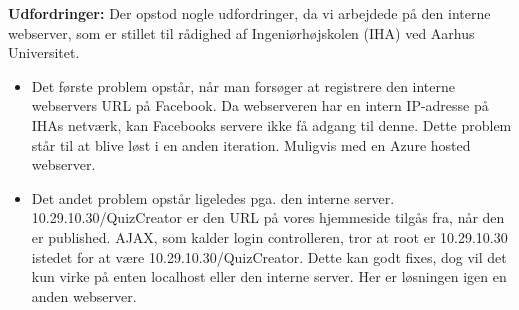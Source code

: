 \textbf{Udfordringer:} 
Der opstod nogle udfordringer, da vi arbejdede på den interne webserver, som er stillet til rådighed af Ingeniørhøjskolen (IHA) ved Aarhus Universitet. 

\begin{itemize}
	\item Det første problem opstår, når man forsøger at registrere den interne webservers URL på Facebook. Da webserveren har en intern IP-adresse på IHAs netværk, kan Facebooks servere ikke få adgang til denne. Dette problem står til at blive løst i en anden iteration. Muligvis med en Azure hosted webserver.
	\item Det andet problem opstår ligeledes pga. den interne server. 10.29.10.30/QuizCreator er den URL på vores hjemmeside tilgås fra, når den er published. AJAX, som kalder login controlleren, tror at root er 10.29.10.30 istedet for at være 10.29.10.30/QuizCreator. Dette kan godt fixes, dog vil det kun virke på enten localhost eller den interne server. Her er løsningen igen en anden webserver.
\end{itemize}